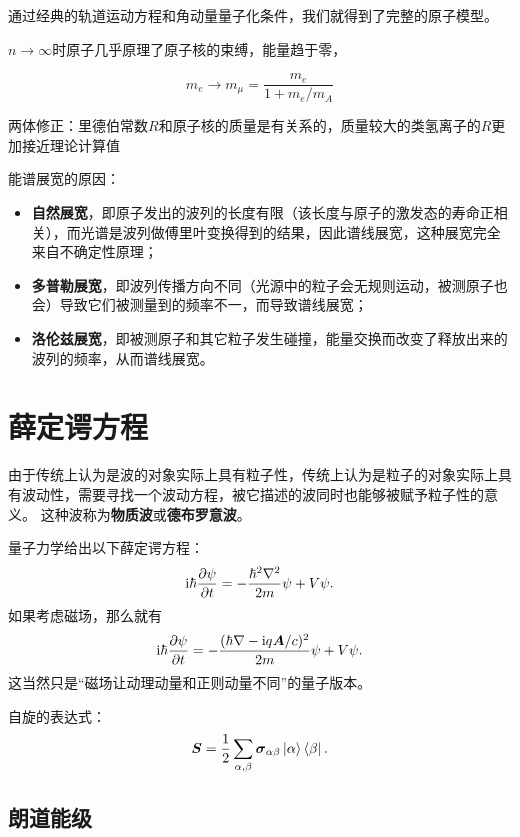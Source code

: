 \documentclass[UTF8, a4paper]{ctexart}
\newcommand*{\ii}{\mathrm{i}}
\begin{document}
通过经典的轨道运动方程和角动量量子化条件，我们就得到了完整的原子模型。

$n\to\infty$时原子几乎原理了原子核的束缚，能量趋于零，

\[
    m_e \longrightarrow m_\mu = \frac{m_e}{1 + m_e/m_A}
\]

两体修正：里德伯常数$R$和原子核的质量是有关系的，质量较大的类氢离子的$R$更加接近理论计算值

能谱展宽的原因：
\begin{itemize}
    \item \textbf{自然展宽}，即原子发出的波列的长度有限（该长度与原子的激发态的寿命正相关），而光谱是波列做傅里叶变换得到的结果，因此谱线展宽，这种展宽完全来自不确定性原理；
    \item \textbf{多普勒展宽}，即波列传播方向不同（光源中的粒子会无规则运动，被测原子也会）导致它们被测量到的频率不一，而导致谱线展宽；
    \item \textbf{洛伦兹展宽}，即被测原子和其它粒子发生碰撞，能量交换而改变了释放出来的波列的频率，从而谱线展宽。
\end{itemize}

\section{薛定谔方程}

由于传统上认为是波的对象实际上具有粒子性，传统上认为是粒子的对象实际上具有波动性，需要寻找一个波动方程，被它描述的波同时也能够被赋予粒子性的意义。
这种波称为\textbf{物质波}或\textbf{德布罗意波}。

量子力学给出以下薛定谔方程：
\begin{equation}
    \ii \hbar \pdv{\psi}{t} = - \frac{\hbar^2 \laplacian}{2m} \psi + V \psi.
\end{equation}
如果考虑磁场，那么就有
\begin{equation}
    \ii \hbar \pdv{\psi}{t} = - \frac{(\hbar \nabla - \ii q \vb*{A}/c)^2}{2m} \psi + V \psi.
\end{equation}
这当然只是“磁场让动理动量和正则动量不同”的量子版本。

自旋的表达式：
\begin{equation}
    \vb*{S} = \frac{1}{2} \sum_{\alpha, \beta} \vb*{\sigma}_{\alpha \beta} \ket{\alpha} \bra{\beta}.
\end{equation}

\subsection{朗道能级}
\end{document}
